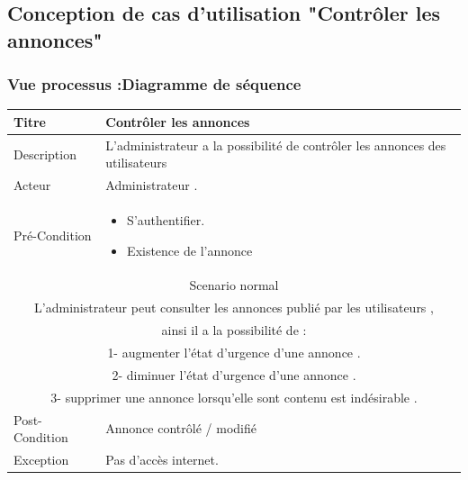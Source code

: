 \documentclass[11pt,a4paper,oneside]{book}
\begin{document}
					\subsection{Conception de cas d’utilisation "Contrôler les annonces"}
					\subsubsection{Vue processus :Diagramme de séquence}
					\begin{tabular}{ |p{3cm}|p{6cm}|  }
						
						\hline
						Titre&  Contrôler les annonces\\
						\hline
						Description  & 
						L’administrateur a la possibilité de contrôler les annonces des utilisateurs\\
						\hline
						Acteur&  Administrateur .\\
						\hline
						Pré-Condition & \begin{itemize}
							\item S’authentifier.
							\item Existence de l’annonce
						\end{itemize}
						\\
						\hline
						\multicolumn{2}{|c|}{Scenario normal} \\
						\hline
						\multicolumn{2}{|c|}{L’administrateur peut consulter les annonces publié par les utilisateurs ,}\\
						
						\multicolumn{2}{|c|}{ 	 ainsi il a la possibilité de :}\\
						\multicolumn{2}{|c|}{1- augmenter l’état d’urgence d’une annonce .} \\
						\multicolumn{2}{|c|}{2- diminuer l’état d’urgence d’une annonce .} \\
						\multicolumn{2}{|c|}{3- supprimer une annonce lorsqu’elle sont contenu est indésirable . } \\
						
						\hline
						Post-Condition& Annonce contrôlé / modifié  \\
						\hline
						Exception&  Pas d’accès internet. 
						\\
						\hline
					\end{tabular}
\end{document}

